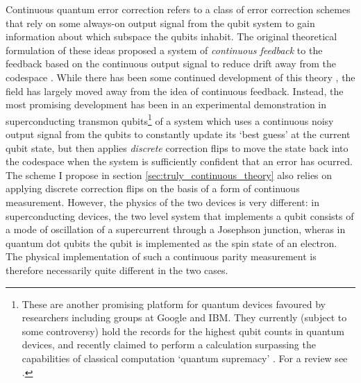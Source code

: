 \documentclass{report}
\begin{document}
Continuous quantum error correction refers to a class of error correction schemes that rely on some always-on output signal from the qubit system to gain information about which subspace the qubits inhabit. The original theoretical formulation of these ideas proposed a system of \textit{continuous feedback} to the feedback based on the continuous output signal to reduce drift away from the codespace \cite{Ahn2002}. While there has been some continued development of this theory \cite{Cardona2018}\cite{Cardona2019}, the field has largely moved away from the idea of continuous feedback. Instead, the most promising development has been in an experimental demonstration in superconducting transmon qubits\footnote{These are another promising platform for quantum devices favoured by researchers including groups at Google and IBM. They currently (subject to some controversy) hold the records for the highest qubit counts in quantum devices, and recently claimed to perform a calculation surpassing the capabilities of classical computation `quantum supremacy' \cite{Arute2019}. For a review see \cite{Huang2020}.} of a system which uses a continuous noisy output signal from the qubits to constantly update its `best guess' at the current qubit state, but then applies \textit{discrete} correction flips to move the state back into the codespace when the system is sufficiently confident that an error has ocurred\cite{Dressel2022}. The scheme I propose in section \ref{sec:truly_continuous_theory} also relies on applying discrete correction flips on the basis of a form of continuous measurement. However, the physics of the two devices is very different: in superconducting devices, the two level system that implements a qubit consists of a mode of oscillation of a supercurrent through a Josephson junction, wheras in quantum dot qubits the qubit is implemented as the spin state of an electron. The physical implementation of such a continuous parity measurement is therefore necessarily quite different in the two cases.
\end{document}

